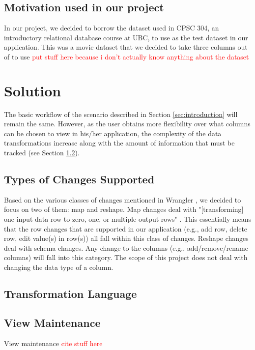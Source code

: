 \documentclass[12pt]{article}
\begin{document}
\subsection{Motivation used in our project}
In our project, we decided to borrow the dataset used in CPSC 304, an introductory relational database course at UBC, to use as the test dataset in our application. This was a movie dataset that we decided to take three columns out of to use \textcolor{red}{put stuff here because i don't actually know anything about the dataset}

\section{Solution}
The basic workflow of the scenario described in Section \ref{sec:introduction} will remain the same. However, as the user obtains more flexibility over what columns can be chosen to view in his/her application,  the complexity of the data transformations increase along with the amount of information that must be tracked (see Section \ref{sec:transformation_language}). 

\subsection{Types of Changes Supported}
Based on the various classes of changes mentioned in Wrangler \cite{kandel2011wrangler}, we decided to focus on two of them: map and reshape. Map changes deal with "[transforming] one input data row to zero, one, or multiple output rows" \cite{kandel2011wrangler}. This essentially means that the row changes that are supported in our application (e.g., add row, delete row, edit value(s) in row(s)) all fall within this class of changes. Reshape changes deal with schema changes. Any change to the columns (e.g., add/remove/rename columns) will fall into this category. The scope of this project does not deal with changing the data type of a column.

\subsection{Transformation Language}
\label{sec:transformation_language}

\subsection{View Maintenance}
View maintenance \textcolor{red}{cite stuff here}
\end{document}
